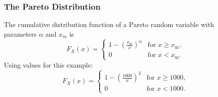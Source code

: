 \documentclass[IntroMain.tex]{subfiles}
\begin{document}
\begin{frame}
\frametitle{The Pareto Distribution}
\Large
\vspace{-1.2cm}
The cumulative distribution function of a Pareto random variable with parameters $\alpha$ and $x_m$ is
\[
F_X(x) = \begin{cases}
1-\left(\frac{x_\mathrm{m}}{x}\right)^\alpha & \text{for } x \ge x_\mathrm{m}, \\
0 & \text{for }x < x_\mathrm{m}.
\end{cases}
\]
Using values for this example:
\[
F_X(x) = \begin{cases}
1-\left(\frac{1000}{x}\right)^3 & \text{for } x \ge 1000, \\
0 & \text{for }x < 1000.
\end{cases}
\]

\end{frame}
\end{document}
